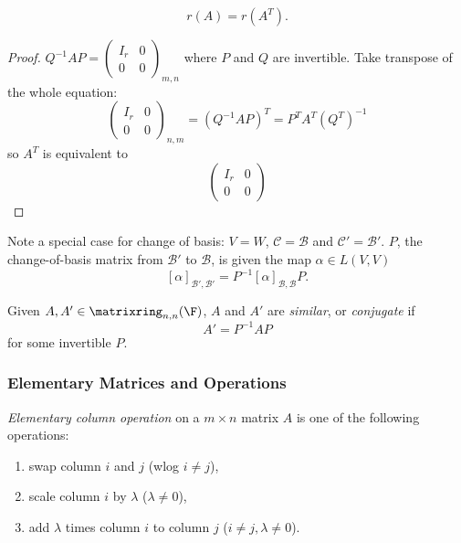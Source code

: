 \documentclass[a4paper]{article}
\newcommand*{\M}{\matrixring}
\newcommand*{\basis}{\mathcal}
\theoremstyle{definition}
\begin{document}
\begin{theorem}
  \label{thm:upper corner matrix}
  \[
    r(A) = r(A^T).
  \]
\end{theorem}

\begin{proof} \(
    Q^{-1}AP =
    \begin{pmatrix}
      I_r & 0 \\
      0 & 0
    \end{pmatrix}_{m, n}
  \) where \(P\) and \(Q\) are invertible. Take transpose of the whole equation:
  \[
    \begin{pmatrix}
      I_r & 0 \\
      0 & 0
    \end{pmatrix}_{n,m}
    =(Q^{-1}AP)^T = P^TA^T(Q^T)^{-1}
  \]
  so \(A^T\) is equivalent to
  \[
      \begin{pmatrix}
      I_r & 0 \\
      0 & 0
    \end{pmatrix}
  \]
\end{proof}

Note a special case for change of basis: \(V = W\), \(\basis C = \basis B\) and \(\basis C' = \basis B'\). \(P\), the change-of-basis matrix from \(\basis B'\) to \(\basis B\), is given the map \(\alpha \in L(V,V)\)
\[
  [\alpha]_{\basis B',\basis B'} = P^{-1}[\alpha]_{\basis B,\basis B}P.
\]

\begin{definition}
  Given \(A, A' \in \M_{n,n}(\F)\), \(A\) and \(A'\) are \emph{similar}, or \emph{conjugate} if
  \[
    A' = P^{-1}AP
  \]
  for some invertible \(P\).
\end{definition}

\subsubsection{Elementary Matrices and Operations}

\begin{definition}
  \emph{Elementary column operation} on a \(m\times n\) matrix \(A\) is one of the following operations:
  \begin{enumerate}
  \item swap column \(i\) and \(j\) (wlog \(i\neq j\)),
  \item scale column \(i\) by \(\lambda\)  (\(\lambda\neq0\)),
  \item add \(\lambda\) times column \(i\) to column \(j\) (\(i\neq j,\lambda\neq 0\)).
  \end{enumerate}
\end{definition}
\end{document}
